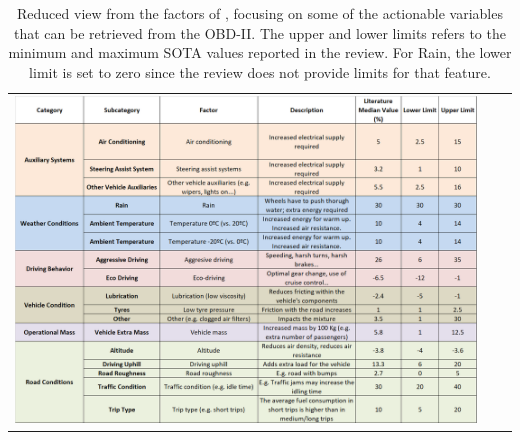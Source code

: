 \begin{table}[]
\centering
 \begin{tabular}{c@{\qquad}c@{\qquad}c}
\includegraphics[width=0.90\columnwidth]{figures/FeatureInfluenceReduced.png}
  \end{tabular} 
  \caption{Reduced view from the factors of \parencite{zacharof2016review}, focusing on some of the actionable variables that can be retrieved from the OBD-II. The upper and lower limits refers to the minimum and maximum SOTA values reported in the review. For Rain, the lower limit is set to zero since the review does not provide limits for that feature. \label{table:ch2-sota-FeatureInfluenceReduced}}
\end{table}

